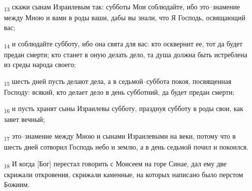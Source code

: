 \begin{tcolorbox}
\textsubscript{13} скажи сынам Израилевым так: субботы Мои соблюдайте, ибо это--знамение между Мною и вами в роды ваши, дабы вы знали, что Я Господь, освящающий вас;
\end{tcolorbox}
\begin{tcolorbox}
\textsubscript{14} и соблюдайте субботу, ибо она свята для вас: кто осквернит ее, тот да будет предан смерти; кто станет в оную делать дело, та душа должна быть истреблена из среды народа своего;
\end{tcolorbox}
\begin{tcolorbox}
\textsubscript{15} шесть дней пусть делают дела, а в седьмой--суббота покоя, посвященная Господу: всякий, кто делает дело в день субботний, да будет предан смерти;
\end{tcolorbox}
\begin{tcolorbox}
\textsubscript{16} и пусть хранят сыны Израилевы субботу, празднуя субботу в роды свои, как завет вечный;
\end{tcolorbox}
\begin{tcolorbox}
\textsubscript{17} это--знамение между Мною и сынами Израилевыми на веки, потому что в шесть дней сотворил Господь небо и землю, а в день седьмой почил и покоился.
\end{tcolorbox}
\begin{tcolorbox}
\textsubscript{18} И когда [Бог] перестал говорить с Моисеем на горе Синае, дал ему две скрижали откровения, скрижали каменные, на которых написано было перстом Божиим.
\end{tcolorbox}
